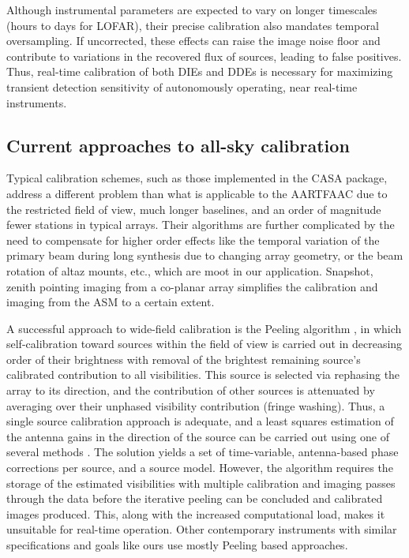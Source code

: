 \documentclass{aa}
\begin{document}
Although  instrumental parameters  are  expected to  vary  on longer  timescales
(hours  to days  for LOFAR),  their precise  calibration also  mandates temporal
oversampling.  If uncorrected, these effects can raise the image noise floor and
contribute  to variations in  the recovered  flux of  sources, leading  to false
positives.  Thus, real-time  calibration of both DIEs and  DDEs is necessary for
maximizing  transient  detection  sensitivity  of autonomously  operating,  near
real-time instruments.

\subsection{Current approaches to all-sky calibration}

Typical  calibration schemes,  such as  those implemented  in the  CASA package,
address a different  problem than what is applicable to the  AARTFAAC due to the
restricted field of view, much longer baselines, and an order of magnitude fewer
stations in  typical arrays.   Their algorithms are  further complicated  by the
need to compensate  for higher order effects like the  temporal variation of the
primary beam during  long synthesis due to changing array  geometry, or the beam
rotation of  altaz mounts, etc., which  are moot in  our application.  Snapshot,
zenith pointing  imaging from a  co-planar array simplifies the  calibration and
imaging from the ASM to a certain extent.

A  successful  approach  to  wide-field  calibration  is  the  Peeling  algorithm
\citep{noordam2004peel,vdTol2007selfcallofar}, in which self-calibration toward
sources within  the field of  view is carried  out in decreasing order  of their
brightness  with  removal  of   the  brightest  remaining  source's  calibrated
contribution  to all  visibilities. This  source is  selected via  rephasing the
array to its  direction, and the contribution of other  sources is attenuated by
averaging over their unphased  visibility contribution (fringe washing). Thus, a
single source calibration  approach is adequate, and a  least squares estimation
of the antenna gains in the direction of the source can be carried out using one
of  several methods  \citep{boonstra2003gain}.   The solution  yields  a set  of
time-variable, antenna-based  phase corrections per source, and  a source model.
However, the algorithm requires the  storage of the estimated visibilities with
multiple calibration  and imaging passes  through the data before  the iterative
peeling can be  concluded and calibrated images produced.  This, along with the
increased computational load, makes it unsuitable for real-time operation.  Other
contemporary  instruments with  similar  specifications and  goals  like ours  use
mostly Peeling  based approaches. 
\end{document}
